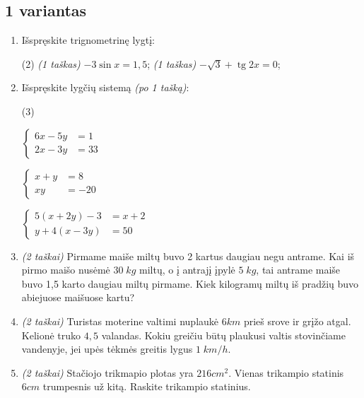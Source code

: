 \documentclass[a4paper]{article}
\DeclareMathOperator{\tg}{tg}
\begin{document}
\subsection*{1 variantas}

\begin{enumerate}
      \item Išspręskite trignometrinę lygtį:
            \begin{tasks}[item-format={\normalfont}, after-item-skip=4mm](2)
                  \task \textit{(1 taškas)} $-3\sin{x}=1,5$;
                  \task \textit{(1 taškas)} $-\sqrt{3}+\tg{2x}=0$;
            \end{tasks}

      \item Išspręskite lygčių sistemą \textit{(po 1 tašką)}:
            \begin{tasks}[item-format={\normalfont}, after-item-skip=4mm](3)
                  \task   \par\vspace{-1.3\baselineskip}%
                  $\left\{\begin{aligned}
                              6x - 5y & = 1  \\
                              2x - 3y & = 33
                        \end{aligned}\right.$

                  \task   \par\vspace{-1.3\baselineskip}%
                  $\left\{\begin{aligned}
                              x + y & = 8   \\
                              xy    & = -20
                        \end{aligned}\right.$
                  \task   \par\vspace{-1.3\baselineskip}%
                  $\left\{\begin{aligned}
                              5(x + 2y) -3 & = x+2 \\
                              y+4(x-3y)    & = 50
                        \end{aligned}\right.$
            \end{tasks}
      \item \textit{(2 taškai)} Pirmame maiše miltų buvo 2 kartus daugiau negu antrame. Kai iš pirmo maišo nusėmė $30\; kg$ miltų, o į antrajį įpylė $5\; kg$, tai antrame maiše buvo 1,5 karto daugiau miltų pirmame. Kiek kilogramų miltų iš pradžių buvo abiejuose maišuose kartu?
      \item \textit{(2 taškai)} Turistas moterine valtimi nuplaukė $6 km$ prieš srove ir grįžo atgal. Kelionė truko $4,5$ valandas. Kokiu greičiu būtų plaukusi valtis stovinčiame vandenyje, jei upės tėkmės greitis lygus $1 \; km/h$.
      \item \textit{(2 taškai)} Stačiojo trikmapio plotas yra $216 cm^2$. Vienas trikampio statinis $6 cm$ trumpesnis už kitą. Raskite trikampio statinius.
\end{enumerate}
\end{document}
